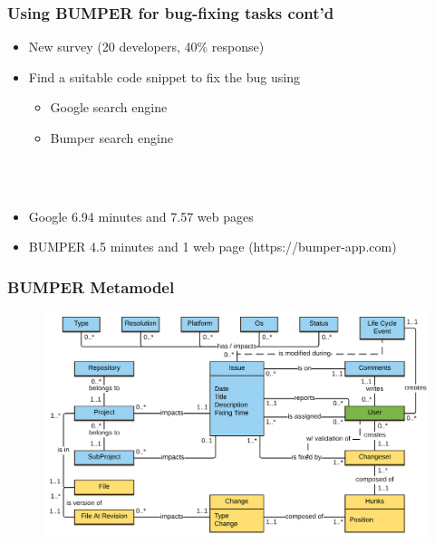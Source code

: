 \documentclass{beamer}
\begin{document}
\begin{frame}

  \frametitle{Using BUMPER for bug-fixing tasks cont'd}


  \begin{itemize}
    \item New survey (20 developers, 40\% response)
    \item Find a suitable code snippet to fix the bug using
    \begin{itemize}
      \item Google search engine
      \item Bumper search engine
    \end{itemize}
  \end{itemize}
  \\ \\
  \begin{itemize}
    \item Google 6.94 minutes and 7.57 web pages
    \item BUMPER 4.5 minutes and 1 web page (https://bumper-app.com)
  \end{itemize}

\end{frame}

\begin{frame}

  \frametitle{BUMPER Metamodel}

  \begin{figure}
    \centering
    \includegraphics[width=1\textwidth]{../media/Bumper-Model.png}
  \vspace{-1.8em}
  \end{figure}

\end{frame}
\end{document}
